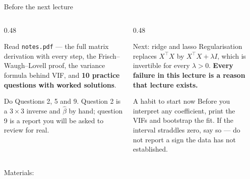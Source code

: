 \documentclass[aspectratio=169]{beamer}
\newcommand{\Xt}{X^{\!\top}}
\begin{document}
\begin{frame}[shrink=3]{Before the next lecture}
  \begin{columns}[T]
    \begin{column}{0.48\textwidth}
      \begin{block}{Read}
        \texttt{notes.pdf} --- the full matrix derivation with every step,
        the Frisch--Waugh--Lovell proof, the variance formula behind VIF, and
        \textbf{10 practice questions with worked solutions}.
      \end{block}
      \begin{block}{Do}
        Questions 2, 5 and 9. Question 2 is a $3\times3$ inverse and
        $\hat\beta$ by hand; question 9 is a report you will be asked to
        review for real.
      \end{block}
    \end{column}
    \begin{column}{0.48\textwidth}
      \begin{exampleblock}{Next: ridge and lasso}
        Regularisation replaces $\Xt X$ by $\Xt X + \lambda I$, which is
        invertible for every $\lambda > 0$. \textbf{Every failure in this
        lecture is a reason that lecture exists.}
      \end{exampleblock}
      \begin{alertblock}{A habit to start now}
        Before you interpret any coefficient, print the VIFs and bootstrap
        the fit. If the interval straddles zero, say so --- do not report a
        sign the data has not established.
      \end{alertblock}
    \end{column}
  \end{columns}
  \begin{center}
    \small Materials: \texttt{\AMLRepoURL}
  \end{center}
  \slidesources{\AMLUnitVSources}
\end{frame}
\end{document}
